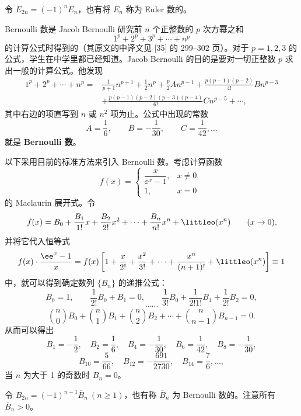 \begin{xremark}
令 $E_{2n}=(-1)^n\overline E_n$，也有将 $\overline E_n$ 称为 Euler 数的。
\end{xremark}

Bernoulli 数是 Jacob Bernoulli 研究前 $n$ 个正整数的 $p$ 次方幂之和
\[
  1^p+2^p+3^p+\cdots+n^p
\]
的计算公式时得到的（其原文的中译文见 [35] 的 299--302 页）。对于 $p=1,2,3$ 的公式，学生在中学里都已经知道。Jacob Bernoulli 的目的是要对一切正整数 $p$ 求出一般的计算公式。他发现
\[
  \begin{aligned}
  1^p+2^p+\cdots+n^p
  ={}&\frac{1}{p+1}n^{p+1}+\frac12n^p+\frac{p}{2}An^{p-1}
  +\frac{p(p-1)(p-2)}{4!}Bn^{p-3}\\
  &+\frac{p(p-1)(p-2)(p-3)(p-4)}{6!}Cn^{p-5}+\cdots,
  \end{aligned}
\]
其中右边的项直写到 $n$ 或 $n^2$ 项为止。公式中出现的常数
\[
  A=\frac16,\qquad B=-\frac{1}{30},\qquad C=\frac{1}{42},\ldots
\]
就是 \textbf{Bernoulli 数}。

以下采用目前的标准方法来引入 Bernoulli 数。考虑计算函数
\[
  f(x)=
  \begin{cases}
    \dfrac{x}{\ee^x-1},&x\neq0,\\
    1,&x=0
  \end{cases}
\]
的 Maclaurin 展开式。令
\[
  f(x)=B_0+\frac{B_1}{1!}x+\frac{B_2}{2!}x^2+\cdots+\frac{B_n}{n!}x^n+\littleo(x^n)\qquad(x\to0),
\]
并将它代入恒等式
\[
  f(x)\cdot\frac{\ee^x-1}{x}
  =f(x)\left[1+\frac{x}{2!}+\frac{x^2}{3!}+\cdots+\frac{x^n}{(n+1)!}+\littleo(x^n)\right]\equiv1
\]
中，就可以得到确定数列 $\{B_n\}$ 的递推公式：
\[
  B_0=1,\qquad \frac{1}{2!}B_0+B_1=0,\qquad
  \frac{1}{3!}B_0+\frac{1}{2!1!}B_1+\frac{1}{2!}B_2=0,
\]
\[
  \cdots\cdots
\]
\[
  \binom n0B_0+\binom n1B_1+\binom n2B_2+\cdots+\binom n{n-1}B_{n-1}=0.
\]
从而可以得出
\[
  B_1=-\frac12,\quad B_2=\frac16,\quad B_4=-\frac{1}{30},\quad B_6=\frac{1}{42},\quad B_8=-\frac{1}{30},
\]
\[
  B_{10}=\frac{5}{66},\quad B_{12}=-\frac{691}{2730},\quad B_{14}=\frac76,\ldots,
\]
当 $n$ 为大于 1 的奇数时 $B_n=0$。

\begin{xremark}
令 $B_{2n}=(-1)^{n-1}\overline B_n\ (n\geqslant1)$，也有称 $\overline B_n$ 为 Bernoulli 数的。注意所有 $\overline B_n>0$。
\end{xremark}

